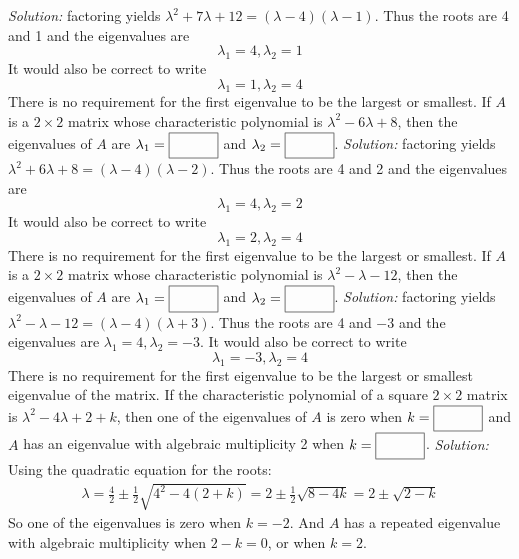 \begin{parts}
        \ifnum {} {\color{DarkBlue} \textit{Solution:} factoring yields $\lambda ^2 + 7\lambda + 12 = (\lambda - 4)(\lambda -1)$. Thus the roots are 4 and 1 and the eigenvalues are $$\lambda_1 = 4, \lambda_2 = 1$$ It would also be correct to write $$\lambda_1 = 1, \lambda_2 = 4$$ There is no requirement for the first eigenvalue to be the largest or smallest. } 
        \fi    
    \fi 
    \ifnum {}
    If $A$ is a $2\times 2$ matrix whose characteristic polynomial is $\lambda ^2 - 6\lambda + 8$, then the eigenvalues of $A$ are $\lambda_1 = \framebox{\strut\hspace{1cm}}$ and $\lambda_2 = \framebox{\strut\hspace{1cm}}$. 
        \ifnum {} {\color{DarkBlue} \textit{Solution:} factoring yields $\lambda ^2 + 6\lambda + 8 = (\lambda - 4)(\lambda -2)$. Thus the roots are 4 and 2 and the eigenvalues are $$\lambda_1 = 4, \lambda_2 = 2$$ It would also be correct to write $$\lambda_1 = 2, \lambda_2 = 4$$ There is no requirement for the first eigenvalue to be the largest or smallest. }
        \fi
    \fi    
    \ifnum {}
    If $A$ is a $2\times 2$ matrix whose characteristic polynomial is $\lambda ^2 - \lambda -12$, then the eigenvalues of $A$ are $\lambda_1 = \framebox{\strut\hspace{1cm}}$ and $\lambda_2 = \framebox{\strut\hspace{1cm}}$. 
        \ifnum {} {\color{DarkBlue} \textit{Solution:} factoring yields $\lambda ^2 - \lambda -12 = (\lambda - 4)(\lambda +3)$. Thus the roots are 4 and $-3$ and the eigenvalues are $\lambda_1 = 4, \lambda_2 = -3$. It would also be correct to write $$\lambda_1 = -3, \lambda_2 = 4$$ There is no requirement for the first eigenvalue to be the largest or smallest eigenvalue of the matrix. }
        \fi
    \fi    
    \ifnum {}
        If the characteristic polynomial of a square $2\times2$ matrix is $\lambda^2 -4\lambda +2 + k$, then one of the eigenvalues of $A$ is zero when $k = \framebox{\strut\hspace{1cm}}$ and $A$ has an eigenvalue with algebraic multiplicity 2 when $k = \framebox{\strut\hspace{1cm}}$. 
        \ifnum {} {\color{DarkBlue} \textit{Solution:} Using the quadratic equation for the roots:
        \begin{align}
            \lambda = \frac{4}{2} \pm \frac12 \sqrt{4^2 - 4(2+k)} = 2 \pm \frac12 \sqrt{8 - 4k} = 2 \pm \sqrt{2 - k}
        \end{align}
        So one of the eigenvalues is zero when $k = -2$. And $A$ has a repeated eigenvalue with algebraic multiplicity when $2-k=0$, or when $k = 2$.} \fi    
    \fi      


\end{parts}

